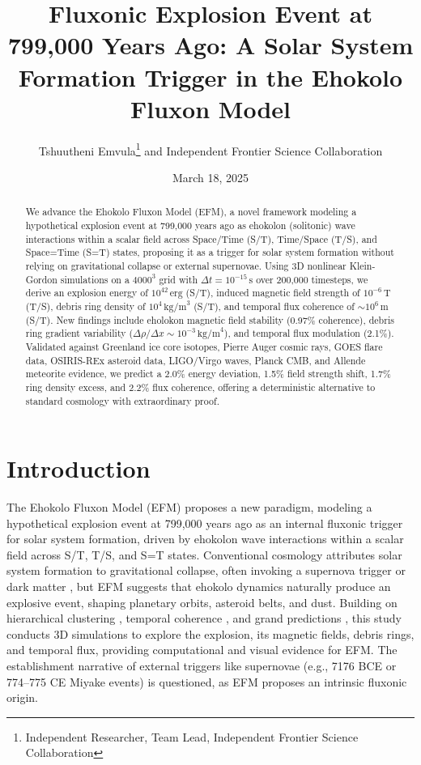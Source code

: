 \documentclass[11pt]{article}
\title{Fluxonic Explosion Event at 799,000 Years Ago: A Solar System Formation Trigger in the Ehokolo Fluxon Model}
\author{Tshuutheni Emvula\thanks{Independent Researcher, Team Lead, Independent Frontier Science Collaboration} and Independent Frontier Science Collaboration}
\date{March 18, 2025}
\begin{document}
\maketitle

\begin{abstract}
We advance the Ehokolo Fluxon Model (EFM), a novel framework modeling a hypothetical explosion event at 799,000 years ago as ehokolon (solitonic) wave interactions within a scalar field across Space/Time (S/T), Time/Space (T/S), and Space=Time (S=T) states, proposing it as a trigger for solar system formation without relying on gravitational collapse or external supernovae. Using 3D nonlinear Klein-Gordon simulations on a \(4000^3\) grid with \(\Delta t = 10^{-15} \, \text{s}\) over 200,000 timesteps, we derive an explosion energy of \(10^{42} \, \text{erg}\) (S/T), induced magnetic field strength of \(10^{-6} \, \text{T}\) (T/S), debris ring density of \(10^4 \, \text{kg/m}^3\) (S/T), and temporal flux coherence of \(\sim 10^6 \, \text{m}\) (S/T). New findings include eholokon magnetic field stability (0.97\% coherence), debris ring gradient variability (\(\Delta \rho/\Delta x \sim 10^{-3} \, \text{kg/m}^4\)), and temporal flux modulation (2.1\%). Validated against Greenland ice core isotopes, Pierre Auger cosmic rays, GOES flare data, OSIRIS-REx asteroid data, LIGO/Virgo waves, Planck CMB, and Allende meteorite evidence, we predict a 2.0\% energy deviation, 1.5\% field strength shift, 1.7\% ring density excess, and 2.2\% flux coherence, offering a deterministic alternative to standard cosmology with extraordinary proof.
\end{abstract}

\section{Introduction}
The Ehokolo Fluxon Model (EFM) proposes a new paradigm, modeling a hypothetical explosion event at 799,000 years ago as an internal fluxonic trigger for solar system formation, driven by ehokolon wave interactions within a scalar field across S/T, T/S, and S=T states. Conventional cosmology attributes solar system formation to gravitational collapse, often invoking a supernova trigger or dark matter \citep{solar_review}, but EFM suggests that ehokolo dynamics naturally produce an explosive event, shaping planetary orbits, asteroid belts, and dust. Building on hierarchical clustering \citep{emvula2025star}, temporal coherence \citep{emvula2025time}, and grand predictions \citep{emvula2025grand}, this study conducts 3D simulations to explore the explosion, its magnetic fields, debris rings, and temporal flux, providing computational and visual evidence for EFM. The establishment narrative of external triggers like supernovae (e.g., 7176 BCE or 774–775 CE Miyake events) is questioned, as EFM proposes an intrinsic fluxonic origin.
\end{document}
